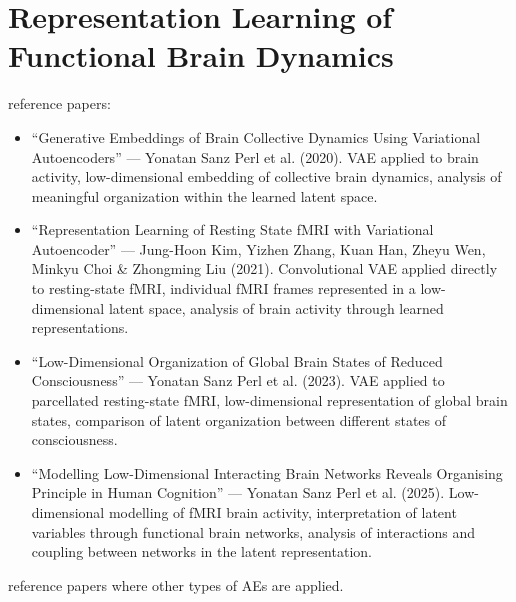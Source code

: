 \section{Representation Learning of Functional Brain Dynamics}

reference papers:
\begin{itemize}
    \item “Generative Embeddings of Brain Collective Dynamics Using Variational Autoencoders” — Yonatan Sanz Perl et al. (2020). VAE applied to brain activity, low-dimensional embedding of collective brain dynamics, analysis of meaningful organization within the learned latent space.
    \item “Representation Learning of Resting State fMRI with Variational Autoencoder” — Jung-Hoon Kim, Yizhen Zhang, Kuan Han, Zheyu Wen, Minkyu Choi \& Zhongming Liu (2021). Convolutional VAE applied directly to resting-state fMRI, individual fMRI frames represented in a low-dimensional latent space, analysis of brain activity through learned representations.
    \item “Low-Dimensional Organization of Global Brain States of Reduced Consciousness” — Yonatan Sanz Perl et al. (2023). VAE applied to parcellated resting-state fMRI, low-dimensional representation of global brain states, comparison of latent organization between different states of consciousness.
    \item “Modelling Low-Dimensional Interacting Brain Networks Reveals Organising Principle in Human Cognition” — Yonatan Sanz Perl et al. (2025). Low-dimensional modelling of fMRI brain activity, interpretation of latent variables through functional brain networks, analysis of interactions and coupling between networks in the latent representation.
\end{itemize}

reference papers where other types of AEs are applied.